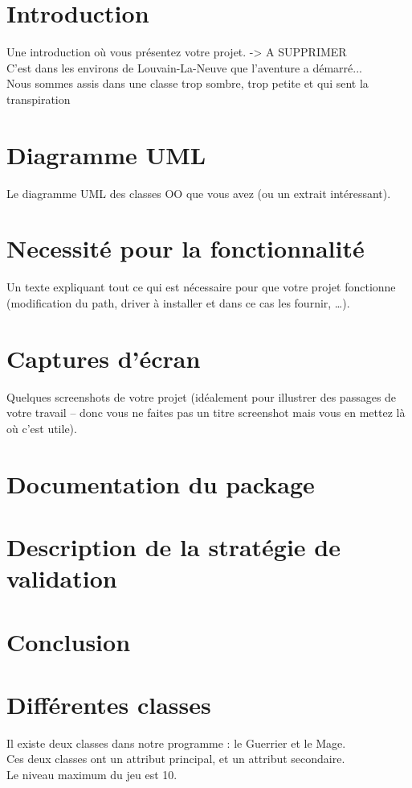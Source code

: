 \documentclass[a4paper,titlepage]{article}
\begin{document}
\section{Introduction}
Une introduction où vous présentez votre projet. -> A SUPPRIMER\\
C'est dans les environs de Louvain-La-Neuve que l'aventure a démarré...\\
Nous sommes assis dans une classe trop sombre, trop petite et qui sent la transpiration

\clearpage
\section{Diagramme UML}
Le diagramme UML des classes OO que vous avez (ou un extrait intéressant).\\
\clearpage

\section{Necessité pour la fonctionnalité}
Un texte expliquant tout ce qui est nécessaire pour que votre projet fonctionne (modification du path, driver à installer et dans ce cas les fournir, …).
\clearpage

\section{Captures d'écran}
Quelques screenshots de votre projet (idéalement pour illustrer des passages de votre travail – donc vous ne faites pas un titre screenshot mais vous en mettez là où c’est utile).
\clearpage

\section{Documentation du package}
\clearpage

\section{Description de la stratégie de validation}
\clearpage

\section{Conclusion}
\clearpage


\section{Différentes classes}
	Il existe deux classes dans notre programme : le Guerrier et le Mage.\\
	Ces deux classes ont un attribut principal, et un attribut secondaire.\\
	Le niveau maximum du jeu est 10.
	
\end{document}
